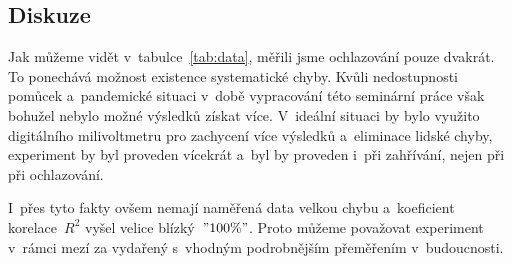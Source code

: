 \subsection{Diskuze}
Jak můžeme vidět v~tabulce~\ref{tab:data}, měřili jsme ochlazování pouze
dvakrát. To ponechává možnost existence systematické chyby. Kvůli nedostupnosti
pomůcek a~pandemické situaci v~době vypracování této seminární
práce však bohužel nebylo možné výsledků získat více. V~ideální situaci by bylo využito
digitálního milivoltmetru pro zachycení více výsledků a~eliminace lidské chyby,
experiment by byl proveden vícekrát a~byl by proveden i~při zahřívání, nejen při
při ochlazování.

I~přes tyto fakty ovšem nemají naměřená data velkou chybu a~koeficient
korelace~$R^2$ vyšel velice blízký~$"100 \%"$. Proto můžeme považovat
experiment v~rámci mezí za vydařený s~vhodným podrobnějším přeměřením
v~budoucnosti.
